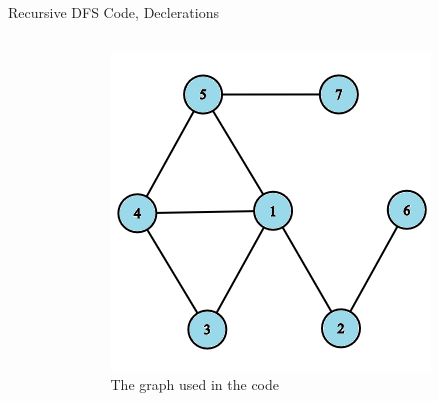 \documentclass[aspectratio=169]{beamer}%
\begin{document}
\begin{frame}{Recursive DFS Code, Declerations}
    \begin{columns}
        \begin{column}{0.70\textwidth}
            
        \end{column}
        \hfill
        \begin{column}{0.25\textwidth}
            \begin{figure}
                \centering
                \includegraphics[width = .9\linewidth]{dfs 21.png}
                \caption{The graph used in the code}
            \end{figure}
        \end{column}
    \end{columns}
\end{frame}
\end{document}
